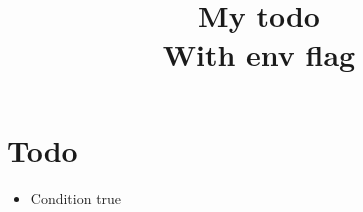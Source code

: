 \documentclass{article}
\title{
  My todo\\\large{
    With env flag
  }
}
\begin{document}
\maketitle


\section{Todo}
\begin{itemize}
  \item Condition true
\end{itemize}


\end{document}
